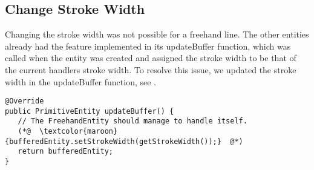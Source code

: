\subsection{Change Stroke Width}
Changing the stroke width was not possible for a freehand line.
The other entities already had the feature implemented in its updateBuffer function, which was called when the entity was created and assigned the stroke width to be that of the current handlers stroke width.
To resolve this issue, we updated the stroke width in the updateBuffer function, see \lstref{}.

\begin{lstlisting}[caption={The change is highlighted in red}, label=as]
@Override
public PrimitiveEntity updateBuffer() {
   // The FreehandEntity should manage to handle itself.
   (*@  \textcolor{maroon}{bufferedEntity.setStrokeWidth(getStrokeWidth());}  @*)
   return bufferedEntity;
}
\end{lstlisting}